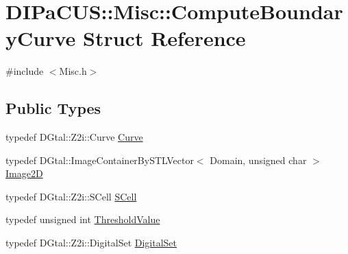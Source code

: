 \hypertarget{structDIPaCUS_1_1Misc_1_1ComputeBoundaryCurve}{}\section{D\+I\+Pa\+C\+US\+:\+:Misc\+:\+:Compute\+Boundary\+Curve Struct Reference}
\label{structDIPaCUS_1_1Misc_1_1ComputeBoundaryCurve}


{\ttfamily \#include $<$Misc.\+h$>$}

\subsection*{Public Types}
\begin{DoxyCompactItemize}
\item 
typedef D\+Gtal\+::\+Z2i\+::\+Curve \hyperlink{structDIPaCUS_1_1Misc_1_1ComputeBoundaryCurve_ac3d7adcd3d9b37d2166c65346e0916d2}{Curve}
\item 
typedef D\+Gtal\+::\+Image\+Container\+By\+S\+T\+L\+Vector$<$ Domain, unsigned char $>$ \hyperlink{structDIPaCUS_1_1Misc_1_1ComputeBoundaryCurve_a67511f091a6fb85b38f29a4df3f480dd}{Image2D}
\item 
typedef D\+Gtal\+::\+Z2i\+::\+S\+Cell \hyperlink{structDIPaCUS_1_1Misc_1_1ComputeBoundaryCurve_affd97ae2b7fea729fca28c9a4bb16fd5}{S\+Cell}
\item 
typedef unsigned int \hyperlink{structDIPaCUS_1_1Misc_1_1ComputeBoundaryCurve_a31db1fa680bce958cccb412fac81fe14}{Threshold\+Value}
\item 
typedef D\+Gtal\+::\+Z2i\+::\+Digital\+Set \hyperlink{structDIPaCUS_1_1Misc_1_1ComputeBoundaryCurve_af25e121edbd5e213e20da7abcc4401cc}{Digital\+Set}
\end{DoxyCompactItemize}
